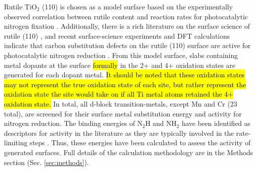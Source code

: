 Rutile TiO$_2$ (110) is chosen as a model surface based on the experimentally observed correlation between rutile content and reaction rates for photocatalytic nitrogen fixation \cite{Schrauzer_1977}. Additionally, there is a rich literature on the surface science of rutile (110) \cite{Diebold_2003, Yates_1991, Lu1994, Walle2009}, and recent surface-science experiments and DFT calculations indicate that carbon substitution defects on the rutile (110) surface are active for photocatalytic nitrogen reduction \cite{Comer_2018b}. From this model surface, slabs containing metal dopants at the surface \hl{formally} in the 2+ and 4+ oxidation states are generated for each dopant metal. \hl{It should be noted that these oxidation states may not  represent the true oxidation state of each site, but rather represent the oxidation state the site would take on if all Ti metal atoms retained the 4+ oxidation state.}
In total, all d-block transition-metals, except Mn and Cr (23 total), are screened for their surface metal substitution energy and activity for nitrogen reduction.  The binding energies of N$_2$H and NH$_2$ have been identified as descriptors for activity in the literature as they are typically involved in the rate-limiting steps \cite{Hoskuldsson_2017, Montoya_2015, Comer_2018}. Thus, these energies have been calculated to assess the activity of generated surfaces.  Full details of the calculation methodology are in the Methods section (Sec. \ref{sec:methods}).


